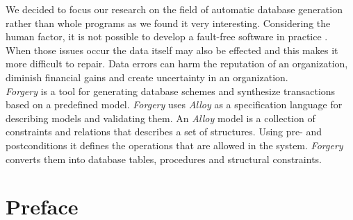 \documentclass[oneside]{book}
\begin{document}
We decided to focus our research on the field of automatic database generation rather than whole programs as we found it very interesting. Considering the human factor, it is not possible to develop a fault-free software in practice \cite{reliability}. When those issues occur the data itself may also be effected and this makes it more difficult to repair. Data errors can harm the reputation of an organization, diminish financial gains and create uncertainty in an organization.\\

\textit{Forgery} is a tool for generating database schemes and synthesize transactions based on a predefined model. \textit{Forgery} uses \textit{Alloy} as a specification language for describing models and validating them. An \textit{Alloy} model is a collection of constraints and relations that describes a set of structures. Using pre- and postconditions it defines the operations that are allowed in the system. \textit{Forgery} converts them into database tables, procedures and structural constraints.

\newpage

\chapter{Preface}
\end{document}
